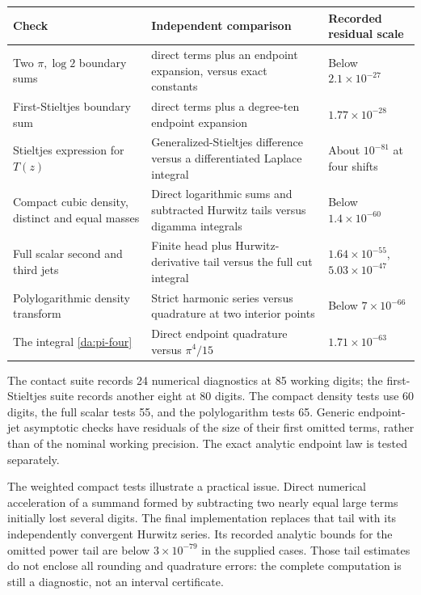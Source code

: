 \documentclass[11pt,letterpaper]{article}
\numberwithin{equation}{section}
\theoremstyle{definition}
\theoremstyle{remark}
\begin{document}
\begin{center}
\small
\renewcommand{\arraystretch}{1.3}
\begin{tabular}{>{\raggedright\arraybackslash}p{}>{\raggedright\arraybackslash}p{}>{\raggedright\arraybackslash}p{}}
\toprule
Check & Independent comparison & Recorded residual scale\\
\midrule
Two \(\pi,\log2\) boundary sums &
257 direct terms plus an endpoint expansion, versus exact constants &
Below \(2.1\times10^{-27}\)\\
First-Stieltjes boundary sum &
257 direct terms plus a degree-ten endpoint expansion &
\(1.77\times10^{-28}\)\\
Stieltjes expression for \(T(z)\) &
Generalized-Stieltjes difference versus a differentiated Laplace integral &
About \(10^{-81}\) at four shifts\\
Compact cubic density, distinct and equal masses &
Direct logarithmic sums and subtracted Hurwitz tails versus digamma integrals &
Below \(1.4\times10^{-60}\)\\
Full scalar second and third jets &
Finite head plus Hurwitz-derivative tail versus the full cut integral &
\(1.64\times10^{-55}\), \(5.03\times10^{-47}\)\\
Polylogarithmic density transform &
Strict harmonic series versus quadrature at two interior points &
Below \(7\times10^{-66}\)\\
The integral \eqref{da:pi-four} &
Direct endpoint quadrature versus \(\pi^4/15\) &
\(1.71\times10^{-63}\)\\
\bottomrule
\end{tabular}
\end{center}

The contact suite records 24 numerical diagnostics at 85 working digits;
the first-Stieltjes suite records another eight at 80 digits. The compact
density tests use 60 digits, the full scalar tests 55, and the
polylogarithm tests 65. Generic endpoint-jet asymptotic checks have residuals
of the size of their first omitted terms, rather than of the nominal
working precision. The exact analytic endpoint law is tested separately.

The weighted compact tests illustrate a practical issue. Direct numerical
acceleration of a summand formed by subtracting two nearly equal large
terms initially lost several digits. The final implementation replaces that
tail with its independently convergent Hurwitz series. Its recorded
analytic bounds for the omitted power tail are below \(3\times10^{-79}\)
in the supplied cases. Those tail estimates do not enclose all rounding
and quadrature errors: the complete computation is still a diagnostic,
not an interval certificate.
\end{document}
